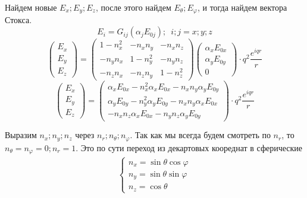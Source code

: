 \documentclass[12pt]{article}
\begin{document}
\begin{large}
\par Найдем новые $ E_x; E_y; E_z $, после этого найдем $E_\theta ; E_\varphi$, и тогда найдем вектора Стокса.
\[
    E_i = G_{ij}\left( \alpha_j E_{0j} \right) ;  \, \, \, i; j = x; y; z
\]
\begin{equation*}
    \begin{pmatrix}
        E_x \\
        E_y \\
        E_z
    \end{pmatrix}
    =
    \begin{pmatrix}
        1 - n_x^2 & -n_x n_y &  -n_x n_z\\
        -n_y n_x & 1 - n_y^2 &  -n_y n_z\\
        -n_z n_x & -n_z n_y &  1 - n_z^2
    \end{pmatrix}
    \begin{pmatrix}
        \alpha_x E_{0x} \\
        \alpha_y E_{0y} \\
        0
    \end{pmatrix}
    \cdot q^2 \frac{e^{iqr}}{r}
\end{equation*}
\begin{equation*}
    \begin{pmatrix}
        E_x \\
        E_y \\
        E_z
    \end{pmatrix}
    =
    \begin{pmatrix}
        \alpha_x E_{0x} - n_x^2 \alpha_x E_{0x} - n_x n_y \alpha_y E_{0y} \\
        \alpha_y E_{0y} - n_y^2 \alpha_y E_{0y} - n_x n_y \alpha_x E_{0x} \\
        - n_x n_z \alpha_x E_{0x} - n_y n_z \alpha_y E_{0y}
    \end{pmatrix}
    \cdot q^2 \frac{e^{iqr}}{r}
\end{equation*}
\par Выразим $n_x; n_y; n_z$ через $n_r; n_\theta; n_\varphi$. Так как мы всегда будем смотреть по $n_r$, то $n_\theta = n_\varphi = 0; n_r = 1$. Это по сути переход из декартовых коореднат в сферические
\begin{eqnarray*}
    \begin{cases}
        n_x = \sin \theta \cos \varphi \\
        n_y = \sin \theta \sin \varphi \\
        n_z = \cos \theta
    \end{cases}

\end{eqnarray*}
\end{large}
\end{document}
